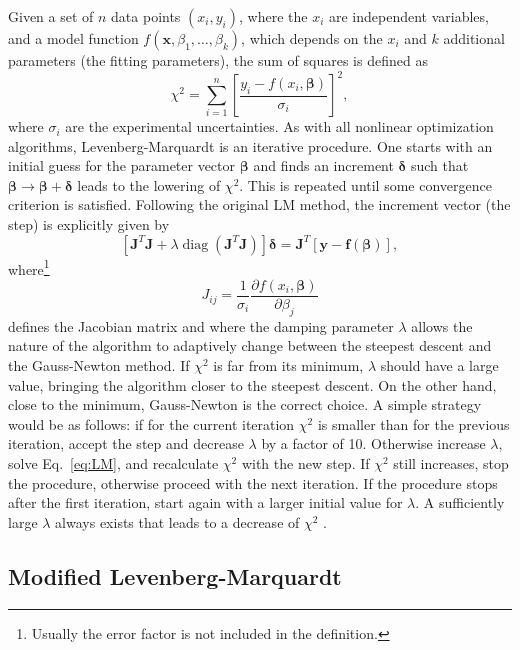 \documentclass{article}
\DeclareMathOperator{\diag}{diag}
\begin{document}
Given a set of $n$ data points $(x_i,y_i)$, where the $x_i$ are
independent variables, and a model function
$f(\bm x, \beta_1, \ldots, \beta_k)$, which depends on the $x_i$ and
$k$ additional parameters (the fitting parameters), the sum of squares
is defined as
\begin{equation}
  \label{eq:chi2}
  \chi^2 = \sum_{i=1}^n \left[ \frac{y_i - f(x_i, \bm\beta)}{\sigma_i}
  \right]^2,
\end{equation}
where $\sigma_i$ are the experimental uncertainties. As with all
nonlinear optimization algorithms, Levenberg-Marquardt is an iterative
procedure. One starts with an initial guess for the parameter vector
$\bm\beta$ and finds an increment $\bm\delta$ such that
$\bm\beta \rightarrow \bm\beta + \bm\delta$ leads to the lowering of
$\chi^2$. This is repeated until some convergence criterion is
satisfied. Following the original LM method, the increment vector (the
step) is explicitly given by
\begin{equation}
  \label{eq:LM}
  \left[\bm J^T \bm J + \lambda\diag \left(\bm J^T \bm J\right)
  \right] \bm\delta = \bm J^T \left[ \bm y - \bm f(\bm \beta) \right],
\end{equation}
where\footnote{Usually the error factor is not included in the
  definition.}
\begin{equation}
  \label{eq:Jacob}
  J_{ij} = \frac{1}{\sigma_i} \frac{\partial f(x_i, \bm \beta)}
  {\partial \beta_j}
\end{equation}
defines the Jacobian matrix and where the damping parameter $\lambda$
allows the nature of the algorithm to adaptively change between the
steepest descent and the Gauss-Newton method. If $\chi^2$ is far from
its minimum, $\lambda$ should have a large value, bringing the
algorithm closer to the steepest descent. On the other hand, close to
the minimum, Gauss-Newton is the correct choice. A simple strategy
would be as follows: if for the current iteration $\chi^2$ is smaller
than for the previous iteration, accept the step and decrease
$\lambda$ by a factor of 10. Otherwise increase $\lambda$, solve
Eq.~\eqref{eq:LM}, and recalculate $\chi^2$ with the new step. If
$\chi^2$ still increases, stop the procedure, otherwise proceed with
the next iteration. If the procedure stops after the first iteration,
start again with a larger initial value for $\lambda$. A sufficiently
large $\lambda$ always exists that leads to a decrease of $\chi^2$
\cite{marquardt63}.

\subsection{\label{sec:mod_lm}Modified Levenberg-Marquardt}
\end{document}
